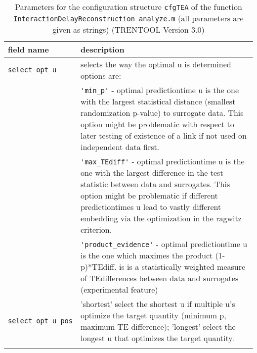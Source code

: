 \begin{table}[H]
\small
\caption[Parameters \texttt{cfgTEA}]{Parameters for the configuration structure \texttt{cfgTEA} of the function \texttt{InteractionDelayReconstruction\_analyze.m} (all parameters are given as strings) (TRENTOOL Version 3.0)} 
\begin{tabularx}{\textwidth}{lX} \toprule
\textbf{field name} & \textbf{description} \\ \midrule
\verb+select_opt_u+ & selects the way the optimal u is determined options are: \\
                 &        \verb+'min_p'+ - optimal predictiontime u is the one
                         with the largest statistical distance (smallest
                         randomization p-value) to  surrogate data.
                         This option might be problematic with
                         respect to later testing of existence of
                         a link if not used on independent data first. \\

                 &        \verb+'max_TEdiff'+ - optimal predictiontime u is the
                         one with the largest difference in the test
                         statistic between data and surrogates.
                         This option might be problematic if different
                         predictiontimes u lead to vastly different
                         embedding via the optimization in the ragwitz
                         criterion. \\
                                                                              
                 &       \verb+'product_evidence'+ - optimal predictiontime u is
                        the one which maximes the product (1-p)*TEdiff.
                        is is a statistically weighted measure of
                        TEdifferences between data and surrogates
                        (experimental feature)\\
\rowcolor{Gray}
\verb+select_opt_u_pos+ & 'shortest' select the shortest u if multiple u's optimize the target quantity (minimum p, maximum TE difference); 'longest' select the longest u that optimizes the target quantity. \\
\bottomrule
\label{tab:cfgTEA}
\end{tabularx}
\end{table}